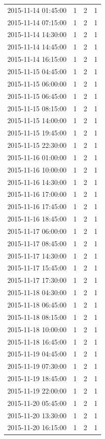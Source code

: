 \begin{tabular}{lrrr}
2015-11-14 01:45:00 & 1 & 2 & 1 \\
2015-11-14 07:15:00 & 1 & 2 & 1 \\
2015-11-14 14:30:00 & 1 & 2 & 1 \\
2015-11-14 14:45:00 & 1 & 2 & 1 \\
2015-11-14 16:15:00 & 1 & 2 & 1 \\
2015-11-15 04:45:00 & 1 & 2 & 1 \\
2015-11-15 06:00:00 & 1 & 2 & 1 \\
2015-11-15 06:45:00 & 1 & 2 & 1 \\
2015-11-15 08:15:00 & 1 & 2 & 1 \\
2015-11-15 14:00:00 & 1 & 2 & 1 \\
2015-11-15 19:45:00 & 1 & 2 & 1 \\
2015-11-15 22:30:00 & 1 & 2 & 1 \\
2015-11-16 01:00:00 & 1 & 2 & 1 \\
2015-11-16 10:00:00 & 1 & 2 & 1 \\
2015-11-16 14:30:00 & 1 & 2 & 1 \\
2015-11-16 17:00:00 & 1 & 2 & 1 \\
2015-11-16 17:45:00 & 1 & 2 & 1 \\
2015-11-16 18:45:00 & 1 & 2 & 1 \\
2015-11-17 06:00:00 & 1 & 2 & 1 \\
2015-11-17 08:45:00 & 1 & 2 & 1 \\
2015-11-17 14:30:00 & 1 & 2 & 1 \\
2015-11-17 15:45:00 & 1 & 2 & 1 \\
2015-11-17 17:30:00 & 1 & 2 & 1 \\
2015-11-18 04:30:00 & 1 & 2 & 1 \\
2015-11-18 06:45:00 & 1 & 2 & 1 \\
2015-11-18 08:15:00 & 1 & 2 & 1 \\
2015-11-18 10:00:00 & 1 & 2 & 1 \\
2015-11-18 16:45:00 & 1 & 2 & 1 \\
2015-11-19 04:45:00 & 1 & 2 & 1 \\
2015-11-19 07:30:00 & 1 & 2 & 1 \\
2015-11-19 18:45:00 & 1 & 2 & 1 \\
2015-11-19 22:00:00 & 1 & 2 & 1 \\
2015-11-20 05:45:00 & 1 & 2 & 1 \\
2015-11-20 13:30:00 & 1 & 2 & 1 \\
2015-11-20 16:15:00 & 1 & 2 & 1 \\

\end{tabular}
